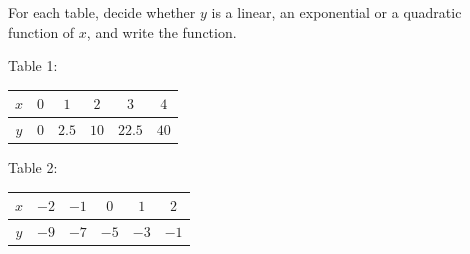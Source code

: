 For each table, decide whether $y$ is a linear, an exponential or a quadratic function of $x$, and write the function.

\begin{center}
Table 1:\quad\begin{tabular}{c|ccccc}$x$&$0$&$1$&$2$&$3$&$4$\\\hline$y$&$0$&$2.5$&$10$&$22.5$&$40$\end{tabular}
\qquad
Table 2:\quad\begin{tabular}{c|ccccc}$x$&$-2$&$-1$&$0$&$1$&$2$\\\hline$y$&$-9$&$-7$&$-5$&$-3$&$-1$\end{tabular}
\end{center}
